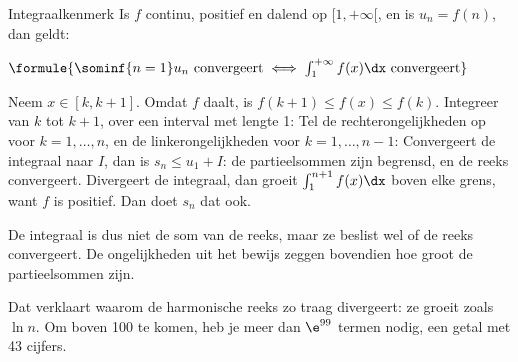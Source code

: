 \begin{theorie}
\begin{stelling}{Integraalkenmerk}
Is $f$ continu, positief en dalend op $[1, +\infty[$, en is $u_n = f(n)$, dan geldt:

\vspace{1mm}
\qquad $\formule{\sominf{n=1} u_n \text{ convergeert} \iff \int_1^{+\infty} f(x)\dx \text{ convergeert}}$
\end{stelling}

\begin{bewijs}
Neem $x \in [k, k+1]$. Omdat $f$ daalt, is $f(k+1) \leqslant f(x) \leqslant f(k)$. Integreer van $k$ tot $k+1$, over een interval met lengte 1:
Tel de rechterongelijkheden op voor $k = 1, \ldots, n$, en de linkerongelijkheden voor $k = 1, \ldots, n-1$:
Convergeert de integraal naar $I$, dan is $s_n \leqslant u_1 + I$: de partieelsommen zijn begrensd, en de reeks convergeert. Divergeert de integraal, dan groeit $\int_1^{n+1} f(x)\dx$ boven elke grens, want $f$ is positief. Dan doet $s_n$ dat ook.
\end{bewijs}
\end{theorie}

De integraal is dus niet de som van de reeks, maar ze beslist wel of de reeks convergeert. De ongelijkheden uit het bewijs zeggen bovendien hoe groot de partieelsommen zijn.


Dat verklaart waarom de harmonische reeks zo traag divergeert: ze groeit zoals $\ln n$. Om boven 100 te komen, heb je meer dan $\e^{99}$ termen nodig, een getal met 43 cijfers.

